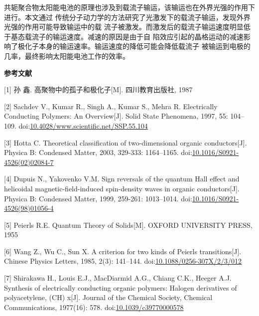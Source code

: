 \documentclass[12pt,]{report}
\begin{document}
共轭聚合物太阳能电池的原理也涉及到载流子输运，该输运也在外界光强的作用下进行。本文通过
传统分子动力学的方法研究了光激发下的载流子输运，发现外界光强的作用可能导致输运中的载
流子被激发。而激发后的载流子输运速度明显低于基态载流子的输运速度。减速的原因是由于自
陷效应引起的晶格运动的减速影响了极化子本身的输运速率。输运速度的降低可能会降低载流子
被输运到电极的几率，最终影响太阳能电池工作的效率。

\clearpage
\clearpage\pagestyle{empty}\mbox{}\clearpage
\begin{center}
\Huge \textbf{参考文献}
\end{center}

\lhead{}  \rhead{} \pagestyle{plain}
 \setlength{\parindent}{0em}

{[}1{]} 孙 鑫. 高聚物中的孤子和极化子{[}M{]}. 四川教育出版社, 1987

{[}2{]} Sachdev V., Kumar R., Singh A., Kumar S., Mehra R. Electrically
Conducting Polymers: An Overview{[}J{]}. Solid State Phenomena, 1997,
55: 104--109.
doi:\href{http://dx.doi.org/10.4028/www.scientific.net/SSP.55.104}{10.4028/www.scientific.net/SSP.55.104}

{[}3{]} Hotta C. Theoretical classification of two-dimensional organic
conductors{[}J{]}. Physica B: Condensed Matter, 2003, 329-333:
1164--1165.
doi:\href{http://dx.doi.org/10.1016/S0921-4526(02)02084-7}{10.1016/S0921-4526(02)02084-7}

{[}4{]} Dupuis N., Yakovenko V.M. Sign reversals of the quantum Hall
effect and helicoidal magnetic-field-induced spin-density waves in
organic conductors{[}J{]}. Physica B: Condensed Matter, 1999, 259-261:
1013--1014.
doi:\href{http://dx.doi.org/10.1016/S0921-4526(98)01056-4}{10.1016/S0921-4526(98)01056-4}

{[}5{]} Peierls R.E. Quantum Theory of Solids{[}M{]}. OXFORD UNIVERSITY
PRESS, 1955

{[}6{]} Wang Z., Wu C., Sun X. A criterion for two kinds of Peierls
transitions{[}J{]}. Chinese Physics Letters, 1985, 2(3): 141--144.
doi:\href{http://dx.doi.org/10.1088/0256-307X/2/3/012}{10.1088/0256-307X/2/3/012}

{[}7{]} Shirakawa H., Louis E.J., MacDiarmid A.G., Chiang C.K., Heeger
A.J. Synthesis of electrically conducting organic polymers: Halogen
derivatives of polyacetylene, (CH) x{[}J{]}. Journal of the Chemical
Society, Chemical Communications, 1977(16): 578.
doi:\href{http://dx.doi.org/10.1039/c39770000578}{10.1039/c39770000578}
\end{document}
